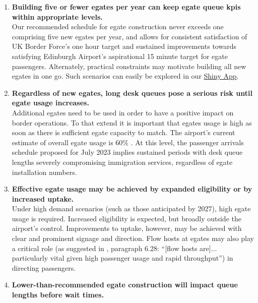\documentclass[10pt]{article}
\begin{document}
\begin{tcolorbox}[
colframe=edi-dark-purple,
colback=edi-light-purple,
fonttitle=\bfseries,
title = {Summary of Key Conclusions}]
\begin{enumerate}

    \item \textbf{Building five or fewer \glspl{egate} per year can keep \gls{egate} queue \glspl{kpi} within appropriate levels.}\\
    Our recommended schedule for \gls{egate} construction never exceeds one comprising five new \glspl{egate} per year, and allows for consistent satisfaction of UK Border Force's one hour target and sustained improvements towards satisfying Edinburgh Airport's aspirational 15 minute target for \gls{egate} passengers. Alternately, practical constraints may motivate building all new \glspl{egate} in one go. Such scenarios can easily be explored in our \href{https://github.com/cobrbra/immigration_queue_simulation_edinburgh_airport}{Shiny App}. \\ 
    \item \textbf{Regardless of new \glspl{egate}, long desk queues pose a serious risk until \gls{egate} usage increases.}\\
     Additional \glspl{egate} need to be used in order to have a positive impact on border operations. To that extend it is important that \glspl{egate} usage is high as soon as there is sufficient \gls{egate} capacity to match. The airport's current estimate of overall \gls{egate} usage is 60\% \cite{modelling_competition}. At this level, the passenger arrivals schedule proposed for July 2023 implies sustained periods with desk queue lengths severely compromising immigration services, regardless of \gls{egate} installation numbers.\\
    
    \item \textbf{Effective \gls{egate} usage may be achieved by expanded eligibility or by increased uptake.}\\
    Under high demand scenarios (such as those anticipated by 2027), high \gls{egate} usage is required. Increased eligibility is expected, but broadly outside the airport's control. Improvements to uptake, however, may be achieved with clear and prominent signage and direction. Flow hosts at \glspl{egate} may also play a critical role (as suggested in \cite{Inspection_eGates}, paragraph 6.28: ``[flow hosts are]... particularly vital given high passenger usage and rapid throughput'') in directing passengers.\\
    
    \item \textbf{Lower-than-recommended \gls{egate} construction will impact queue lengths before wait times.}\\
\end{enumerate}
\end{tcolorbox}
\end{document}
